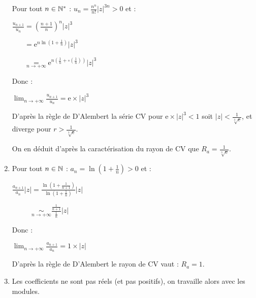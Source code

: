 \documentclass{book}
\begin{document}
\begin{Exercice}
\begin{Correction}
\begin{enumerate}
Pour tout $n \in \mathbb{N}^*$ : $u_n = \frac{n^n }{n!} |z|^{3n}> 0$ et :    
    
		\hspace{0.7cm} $\frac{ u_{n+1} }{ u_n } = \left( \frac{n+1}{n}\right)^n |z|^3$

		\hspace{0.7cm} $\phantom{ \frac{ u_{n+1} }{ u_n } } = \mathrm{e}^{n \ln \left( 1+\frac{1}{n} \right) } |z|^3$

		\hspace{0.7cm} $\phantom{ \frac{ u_{n+1} }{ u_n } } \underset{ n \to + \infty }{=} \mathrm{e}^{n   \left( \frac{1}{n} +  \circ \left( \frac{1}{n} \right) \right) } |z|^3$
		
	Donc :
	
		\hspace{0.7cm} $\lim_{n \to + \infty} \frac{ u_{n+1} }{ u_n } = \mathrm{e} \times |z|^3$ 
		
	D'après la règle de D'Alembert la série CV pour $ \mathrm{e} \times |z|^3 < 1$ soit $|z| < \frac{1}{\sqrt[3]{\mathrm{e}}}$, et diverge pour $r > \frac{1}{\sqrt[3]{\mathrm{e}}}$.	

\smallskip

On en déduit d'après la caractérisation du rayon de CV que $R_a = 	\frac{1}{\sqrt[3]{\mathrm{e}}}$.
	
	\item %
	Pour tout $n \in \mathbb{N}$ : $a_n = \ln \left( 1 + \frac{ 1 }{ n } \right) > 0$ et :    
    
		\hspace{0.7cm} $\frac{ a_{n+1} }{ a_n } |z| = \frac{ \ln \left( 1 + \frac{ 1 }{ n+1 } \right) }{ \ln \left( 1 + \frac{ 1 }{ n } \right)  } |z|$

		\hspace{0.7cm} $\phantom{ \frac{ a_{n+1} }{ a_n } |z| } \underset{ n \to + \infty }{\sim} \frac{ \frac{1}{n+1} }{ \frac{1}{n} } |z|$
				
	Donc :
	
		\hspace{0.7cm} $\lim_{n \to + \infty} \frac{ a_{n+1} }{ a_n } = 1 \times |z|$ 
		
	D'après la règle de D'Alembert le rayon de CV vaut : $R_a = 1$.	
		

	\item %
Les coefficients ne sont pas réels (et pas positifs), on travaille alors avec les modules.
	

\end{enumerate}
\end{Correction}
\end{Exercice}
\end{document}
